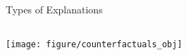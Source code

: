 \documentclass[11pt,compress,t,notes=noshow, aspectratio=169, xcolor=table]{beamer}
\begin{document}
\begin{frame}{Types of Explanations}
{\begin{columns}[c, totalwidth=\textwidth]
\begin{column}{0.38\linewidth}
        \centering \texttt{[image: figure/counterfactuals\_obj]}
    \end{column}
	\end{columns}}
	
\end{frame}











\end{document}

